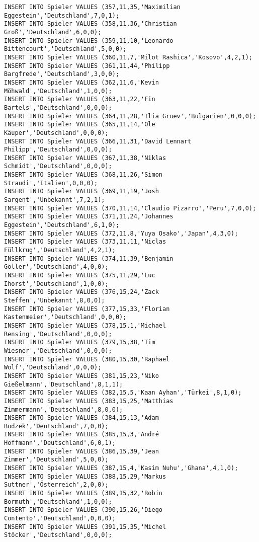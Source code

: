 \documentclass{lehramt-informatik-aufgabe}
\begin{document}
\begin{verbatim}
INSERT INTO Spieler VALUES (357,11,35,'Maximilian Eggestein','Deutschland',7,0,1);
INSERT INTO Spieler VALUES (358,11,36,'Christian Groß','Deutschland',6,0,0);
INSERT INTO Spieler VALUES (359,11,10,'Leonardo Bittencourt','Deutschland',5,0,0);
INSERT INTO Spieler VALUES (360,11,7,'Milot Rashica','Kosovo',4,2,1);
INSERT INTO Spieler VALUES (361,11,44,'Philipp Bargfrede','Deutschland',3,0,0);
INSERT INTO Spieler VALUES (362,11,6,'Kevin Möhwald','Deutschland',1,0,0);
INSERT INTO Spieler VALUES (363,11,22,'Fin Bartels','Deutschland',0,0,0);
INSERT INTO Spieler VALUES (364,11,28,'Ilia Gruev','Bulgarien',0,0,0);
INSERT INTO Spieler VALUES (365,11,14,'Ole Käuper','Deutschland',0,0,0);
INSERT INTO Spieler VALUES (366,11,31,'David Lennart Philipp','Deutschland',0,0,0);
INSERT INTO Spieler VALUES (367,11,38,'Niklas Schmidt','Deutschland',0,0,0);
INSERT INTO Spieler VALUES (368,11,26,'Simon Straudi','Italien',0,0,0);
INSERT INTO Spieler VALUES (369,11,19,'Josh Sargent','Unbekannt',7,2,1);
INSERT INTO Spieler VALUES (370,11,14,'Claudio Pizarro','Peru',7,0,0);
INSERT INTO Spieler VALUES (371,11,24,'Johannes Eggestein','Deutschland',6,1,0);
INSERT INTO Spieler VALUES (372,11,8,'Yuya Osako','Japan',4,3,0);
INSERT INTO Spieler VALUES (373,11,11,'Niclas Füllkrug','Deutschland',4,2,1);
INSERT INTO Spieler VALUES (374,11,39,'Benjamin Goller','Deutschland',4,0,0);
INSERT INTO Spieler VALUES (375,11,29,'Luc Ihorst','Deutschland',1,0,0);
INSERT INTO Spieler VALUES (376,15,24,'Zack Steffen','Unbekannt',8,0,0);
INSERT INTO Spieler VALUES (377,15,33,'Florian Kastenmeier','Deutschland',0,0,0);
INSERT INTO Spieler VALUES (378,15,1,'Michael Rensing','Deutschland',0,0,0);
INSERT INTO Spieler VALUES (379,15,38,'Tim Wiesner','Deutschland',0,0,0);
INSERT INTO Spieler VALUES (380,15,30,'Raphael Wolf','Deutschland',0,0,0);
INSERT INTO Spieler VALUES (381,15,23,'Niko Gießelmann','Deutschland',8,1,1);
INSERT INTO Spieler VALUES (382,15,5,'Kaan Ayhan','Türkei',8,1,0);
INSERT INTO Spieler VALUES (383,15,25,'Matthias Zimmermann','Deutschland',8,0,0);
INSERT INTO Spieler VALUES (384,15,13,'Adam Bodzek','Deutschland',7,0,0);
INSERT INTO Spieler VALUES (385,15,3,'André Hoffmann','Deutschland',6,0,1);
INSERT INTO Spieler VALUES (386,15,39,'Jean Zimmer','Deutschland',5,0,0);
INSERT INTO Spieler VALUES (387,15,4,'Kasim Nuhu','Ghana',4,1,0);
INSERT INTO Spieler VALUES (388,15,29,'Markus Suttner','Österreich',2,0,0);
INSERT INTO Spieler VALUES (389,15,32,'Robin Bormuth','Deutschland',1,0,0);
INSERT INTO Spieler VALUES (390,15,26,'Diego Contento','Deutschland',0,0,0);
INSERT INTO Spieler VALUES (391,15,35,'Michel Stöcker','Deutschland',0,0,0);

\end{verbatim}
\end{document}
